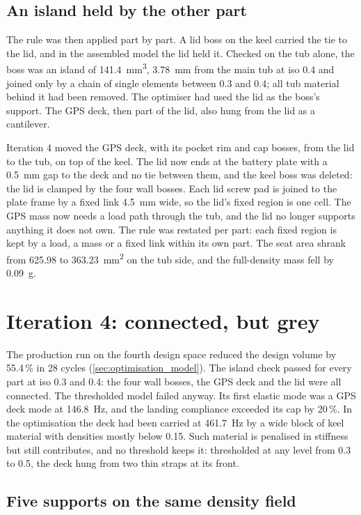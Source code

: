 \subsection{An island held by the other part}

The rule was then applied part by part. A lid boss on the keel carried the tie to the lid, and in the assembled model the lid held it. Checked on the tub alone, the boss was an island of \SI{141.4}{mm^3}, \SI{3.78}{mm} from the main tub at iso 0.4 and joined only by a chain of single elements between 0.3 and 0.4; all tub material behind it had been removed. The optimiser had used the lid as the boss's support. The GPS deck, then part of the lid, also hung from the lid as a cantilever.

Iteration 4 moved the GPS deck, with its pocket rim and cap bosses, from the lid to the tub, on top of the keel. The lid now ends at the battery plate with a \SI{0.5}{mm} gap to the deck and no tie between them, and the keel boss was deleted: the lid is clamped by the four wall bosses. Each lid screw pad is joined to the plate frame by a fixed link \SI{4.5}{mm} wide, so the lid's fixed region is one cell. The GPS mass now needs a load path through the tub, and the lid no longer supports anything it does not own. The rule was restated per part: each fixed region is kept by a load, a mass or a fixed link within its own part. The seat area shrank from 625.98 to \SI{363.23}{mm^2} on the tub side, and the full-density mass fell by \SI{0.09}{g}.

\section{Iteration 4: connected, but grey}\label{sec:iter-grey}

The production run on the fourth design space reduced the design volume by 55.4\,\% in 28 cycles (\cref{sec:optimisation_model}). The island check passed for every part at iso 0.3 and 0.4: the four wall bosses, the GPS deck and the lid were all connected. The thresholded model failed anyway. Its first elastic mode was a GPS deck mode at \SI{146.8}{Hz}, and the landing compliance exceeded its cap by 20\,\%. In the optimisation the deck had been carried at \SI{461.7}{Hz} by a wide block of keel material with densities mostly below 0.15. Such material is penalised in stiffness but still contributes, and no threshold keeps it: thresholded at any level from 0.3 to 0.5, the deck hung from two thin straps at its front.

\subsection{Five supports on the same density field}

